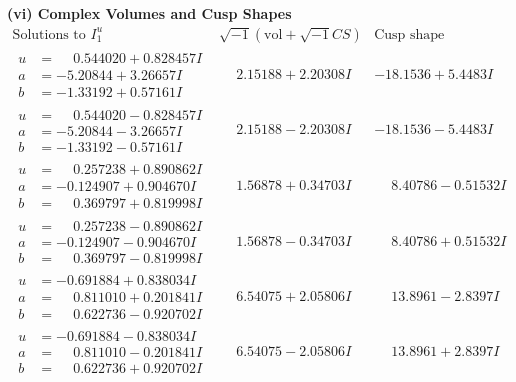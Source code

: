 \documentclass[1p]{elsarticle_modified}
\theoremstyle{definition}
\newcommand{\I}{\sqrt{-1}}
\begin{document}
\newpage\flushleft \textbf{(vi) Complex Volumes and Cusp Shapes}
$$\begin{array}{c|c|c}  
\text{Solutions to }I^u_{1}& \I (\text{vol} + \sqrt{-1}CS) & \text{Cusp shape}\\
 \hline 
\begin{aligned}
u &= \phantom{-}0.544020 + 0.828457 I \\
a &= -5.20844 + 3.26657 I \\
b &= -1.33192 + 0.57161 I\end{aligned}
 & \phantom{-}2.15188 + 2.20308 I & -18.1536 + 5.4483 I \\ \hline\begin{aligned}
u &= \phantom{-}0.544020 - 0.828457 I \\
a &= -5.20844 - 3.26657 I \\
b &= -1.33192 - 0.57161 I\end{aligned}
 & \phantom{-}2.15188 - 2.20308 I & -18.1536 - 5.4483 I \\ \hline\begin{aligned}
u &= \phantom{-}0.257238 + 0.890862 I \\
a &= -0.124907 + 0.904670 I \\
b &= \phantom{-}0.369797 + 0.819998 I\end{aligned}
 & \phantom{-}1.56878 + 0.34703 I & \phantom{-}8.40786 - 0.51532 I \\ \hline\begin{aligned}
u &= \phantom{-}0.257238 - 0.890862 I \\
a &= -0.124907 - 0.904670 I \\
b &= \phantom{-}0.369797 - 0.819998 I\end{aligned}
 & \phantom{-}1.56878 - 0.34703 I & \phantom{-}8.40786 + 0.51532 I \\ \hline\begin{aligned}
u &= -0.691884 + 0.838034 I \\
a &= \phantom{-}0.811010 + 0.201841 I \\
b &= \phantom{-}0.622736 - 0.920702 I\end{aligned}
 & \phantom{-}6.54075 + 2.05806 I & \phantom{-}13.8961 - 2.8397 I \\ \hline\begin{aligned}
u &= -0.691884 - 0.838034 I \\
a &= \phantom{-}0.811010 - 0.201841 I \\
b &= \phantom{-}0.622736 + 0.920702 I\end{aligned}
 & \phantom{-}6.54075 - 2.05806 I & \phantom{-}13.8961 + 2.8397 I \\ \hline\begin{aligned}

\end{aligned}
\end{array}$$
\end{document}
